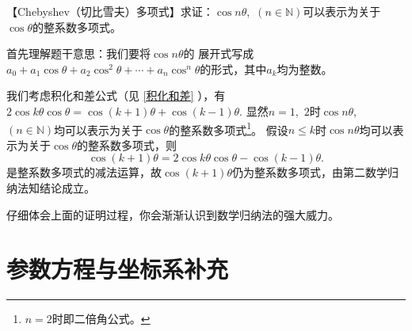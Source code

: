 \begin{example}
    【\textup{Chebyshev}（切比雪夫）多项式】求证：$\cos n\theta$,~$(n \in \mathbb{N})$可以表示为关于$\cos \theta$的整系数多项式。
\end{example}
\begin{prove}
    首先理解题干意思：我们要将$\cos n\theta$的
    展开式写成$a_0+a_1\cos \theta+a_2\cos^2 \theta+\cdots +a_n \cos^n\theta$的形式，其中$a_k$均为整数。


    我们考虑积化和差公式（见 \autoref{积化和差} ），有$2\cos k\theta\cos \theta=\cos (k+1)\theta +\cos (k-1)\theta$.
    显然$n=1$,~$2$时$\cos n\theta$,~$(n \in \mathbb{N})$均可以表示为关于$\cos \theta$的整系数多项式\footnote{$n=2$时即二倍角公式。}。
    假设$n\leqslant k$时$\cos n\theta$均可以表示为关于$\cos \theta$的整系数多项式，则
    \[
        \cos (k+1)\theta=2\cos k\theta\cos \theta-\cos (k-1)\theta
        .\]
    是整系数多项式的减法运算，故$\cos (k+1)\theta$仍为整系数多项式，由第二数学归纳法知结论成立。
\end{prove}
仔细体会上面的证明过程，你会渐渐认识到数学归纳法的强大威力。

\section{参数方程与坐标系补充}

